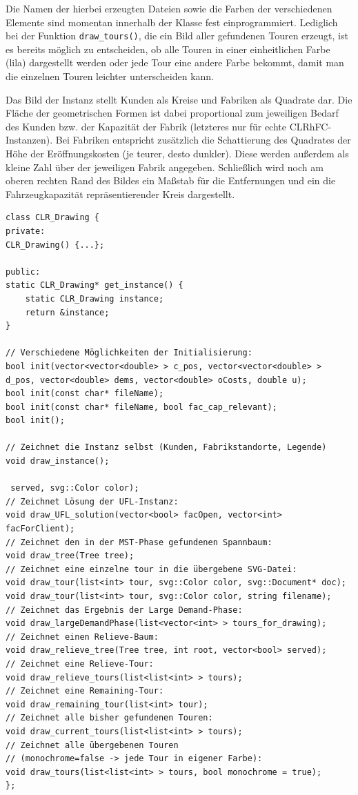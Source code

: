 \documentclass[a4paper,ngerman,11pt,bibtotoc]{scrartcl}
\theoremstyle{definition}
\theoremstyle{plain}
\theoremstyle{remark}
\newcommand{\CLRHFC}{CLRhFC}
\begin{document}
Die Namen der hierbei erzeugten Dateien sowie die Farben der verschiedenen Elemente sind momentan innerhalb der Klasse fest einprogrammiert. Lediglich bei der Funktion \lstinline|draw_tours()|, die ein Bild aller gefundenen Touren erzeugt, ist es bereits möglich zu entscheiden, ob alle Touren in einer einheitlichen Farbe (lila) dargestellt werden oder jede Tour eine andere Farbe bekommt, damit man die einzelnen Touren leichter unterscheiden kann.

Das Bild der Instanz stellt Kunden als Kreise und Fabriken als Quadrate dar. Die Fläche der geometrischen Formen ist dabei proportional zum jeweiligen Bedarf des Kunden bzw. der Kapazität der Fabrik (letzteres nur für echte \CLRHFC-Instanzen). Bei Fabriken entspricht zusätzlich die Schattierung des Quadrates der Höhe der Eröffnungskosten (je teurer, desto dunkler). Diese werden außerdem als kleine Zahl über der jeweiligen Fabrik angegeben. Schließlich wird noch am oberen rechten Rand des Bildes ein Maßstab für die Entfernungen und ein die Fahrzeugkapazität repräsentierender Kreis dargestellt.

\begin{lstlisting}[caption=Die Klasse \lstinline|CLR_Drawing| (gekürzt)]
class CLR_Drawing {
private:
CLR_Drawing() {...};

public:
static CLR_Drawing* get_instance() {
	static CLR_Drawing instance;
	return &instance;
}

// Verschiedene Möglichkeiten der Initialisierung:
bool init(vector<vector<double> > c_pos, vector<vector<double> > 
d_pos, vector<double> dems, vector<double> oCosts, double u);
bool init(const char* fileName);
bool init(const char* fileName, bool fac_cap_relevant);
bool init();

// Zeichnet die Instanz selbst (Kunden, Fabrikstandorte, Legende)
void draw_instance();

 served, svg::Color color);
// Zeichnet Lösung der UFL-Instanz:
void draw_UFL_solution(vector<bool> facOpen, vector<int> facForClient);
// Zeichnet den in der MST-Phase gefundenen Spannbaum:
void draw_tree(Tree tree);
// Zeichnet eine einzelne tour in die übergebene SVG-Datei:
void draw_tour(list<int> tour, svg::Color color, svg::Document* doc);
void draw_tour(list<int> tour, svg::Color color, string filename);
// Zeichnet das Ergebnis der Large Demand-Phase:
void draw_largeDemandPhase(list<vector<int> > tours_for_drawing);
// Zeichnet einen Relieve-Baum:
void draw_relieve_tree(Tree tree, int root, vector<bool> served);
// Zeichnet eine Relieve-Tour:
void draw_relieve_tours(list<list<int> > tours);
// Zeichnet eine Remaining-Tour:
void draw_remaining_tour(list<int> tour);
// Zeichnet alle bisher gefundenen Touren:
void draw_current_tours(list<list<int> > tours);
// Zeichnet alle übergebenen Touren
// (monochrome=false -> jede Tour in eigener Farbe):
void draw_tours(list<list<int> > tours, bool monochrome = true);
};
\end{lstlisting}
\end{document}
